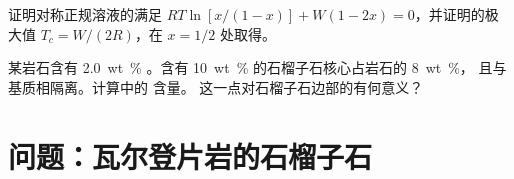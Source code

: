 \begin{exercise}[$\star\star\star$]\label{exo:b3:petrological-thermodynamics:11}
证明对称正规溶液的满足 $RT\ln[x/(1 -
x)] + W(1 - 2x) = 0$，并证明的极大值 $T_c = W/(2R)$，在 $x
= 1/2$ 处取得。
\end{exercise}

\begin{exercise}[$\star\star\star$]\label{exo:b3:petrological-thermodynamics:12}
某岩石含有 \qty{2.0}{wt\percent} 。含有
\qty{10}{wt\percent}  的石榴子石核心占岩石的 \qty{8}{wt\percent}，
且与基质相隔离。计算中的  含量。
这一点对石榴子石边部的有何意义？
\end{exercise}

\section{问题：瓦尔登片岩的石榴子石}

